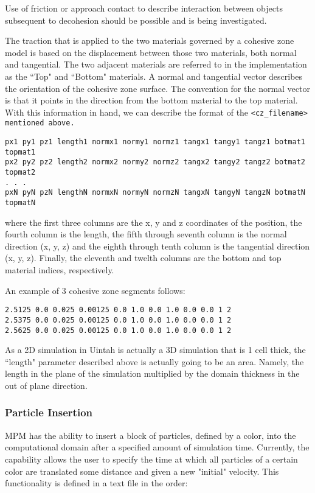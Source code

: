 Use of friction or approach contact to describe interaction between objects
subsequent to decohesion should be possible and is being investigated.

The traction that is applied to the two materials governed by a
cohesive zone model is based on the displacement between those two materials,
both normal and tangential.  The two adjacent materials are referred to in the
implementation as the ``Top" and ``Bottom" materials.  A normal and tangential
vector describes the orientation of the cohesive zone surface.  The convention
for the normal vector is that it points in the direction from the bottom
material to the top material.  With this information in hand, we can describe
the format of the \tt <cz\_filename> \normalfont mentioned above.

\begin{Verbatim}
px1 py1 pz1 length1 normx1 normy1 normz1 tangx1 tangy1 tangz1 botmat1 topmat1
px2 py2 pz2 length2 normx2 normy2 normz2 tangx2 tangy2 tangz2 botmat2 topmat2
. . .
pxN pyN pzN lengthN normxN normyN normzN tangxN tangyN tangzN botmatN topmatN
\end{Verbatim}

where the first three columns are the x, y and z coordinates of the position, 
the fourth column is the length, the fifth through seventh column is the normal
direction (x, y, z) and the eighth through tenth column is the tangential
direction (x, y, z).  Finally, the eleventh and twelth columns are the bottom
and top material indices, respectively.

An example of 3 cohesive zone segments follows:

\begin{Verbatim}
2.5125 0.0 0.025 0.00125 0.0 1.0 0.0 1.0 0.0 0.0 1 2
2.5375 0.0 0.025 0.00125 0.0 1.0 0.0 1.0 0.0 0.0 1 2
2.5625 0.0 0.025 0.00125 0.0 1.0 0.0 1.0 0.0 0.0 1 2
\end{Verbatim}

As a 2D simulation in Uintah is actually a 3D simulation that is 1 cell thick,
the ``length" parameter described above is actually going to be an area.
Namely, the length in the plane of the simulation multiplied by the domain
thickness in the out of plane direction.

\subsubsection{Particle Insertion} \label{Sec:ParticleInsert}
MPM has the ability to insert a block of particles, defined by a color,
 into the computational domain after a specified amount of simulation time.  Currently, 
the capability allows the user to specify the time at which all particles of 
a certain color are translated some distance and given a new "initial" velocity.  
This functionality is defined in a text file in the order: 

